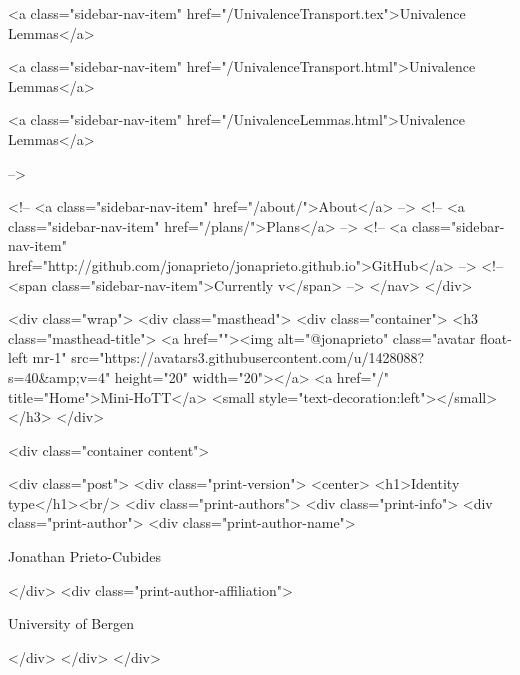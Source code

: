       
    
      
        
          <a class="sidebar-nav-item" href="/UnivalenceTransport.tex">Univalence Lemmas</a>
        
      
    
      
        
          <a class="sidebar-nav-item" href="/UnivalenceTransport.html">Univalence Lemmas</a>
        
      
    
      
        
          <a class="sidebar-nav-item" href="/UnivalenceLemmas.html">Univalence Lemmas</a>
        
      
     -->

    <!-- <a class="sidebar-nav-item" href="/about/">About</a> -->
    <!-- <a class="sidebar-nav-item" href="/plans/">Plans</a> -->
    <!-- <a class="sidebar-nav-item" href="http://github.com/jonaprieto/jonaprieto.github.io">GitHub</a> -->
    <!-- <span class="sidebar-nav-item">Currently v</span> -->
  </nav>
</div>

    <div class="wrap">
      <div class="masthead">
        <div class="container">
          <h3 class="masthead-title">
            <a href=""><img alt="@jonaprieto" class="avatar float-left mr-1" src="https://avatars3.githubusercontent.com/u/1428088?s=40&amp;v=4" height="20" width="20"></a>
            <a href="/" title="Home">Mini-HoTT</a>
            <small style="text-decoration:left"></small>
          </h3>
        </div>
      
      <div class="container content">
        







<div class="post">
  <div class="print-version">
    <center>
      <h1>Identity type</h1><br/>
        <div class="print-authors">
          <div class="print-info">
            <div class="print-author">
              <div class="print-author-name">
                
                  Jonathan Prieto-Cubides
                
              </div>
              <div class="print-author-affiliation">
                
                  University of Bergen
                
                </div>
            </div>
          </div>
          
